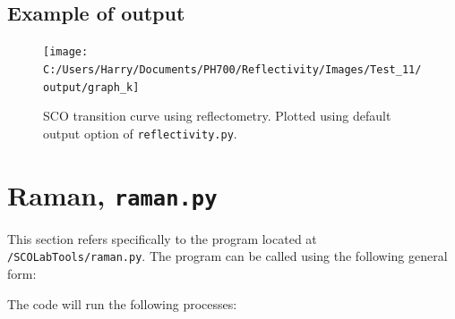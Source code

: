 \subsection{Example of output}

\begin{figure}[H]
\centering
\texttt{[image: C:/Users/Harry/Documents/PH700/Reflectivity/Images/Test\_11/output/graph\_k]}
\caption{SCO transition curve using reflectometry. Plotted using default output option of \texttt{reflectivity.py}.}
\label{fig:graph_k}
\end{figure}


\pagebreak
\section{Raman, \texttt{raman.py}}

This section refers specifically to the program located at \texttt{\root{}/SCOLabTools/raman.py}. The program can be called using the following general form:


The code will run the following processes:

